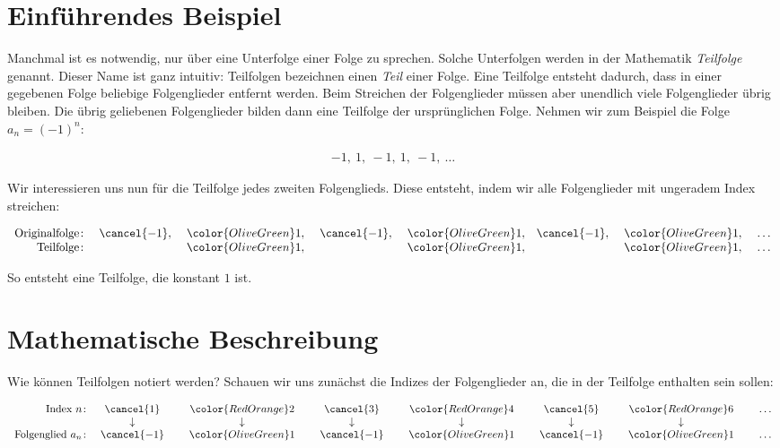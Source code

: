 \documentclass[fontsize=9pt,
               parskip=half-,
               DIV=14,
               listof=chapterentry,
               tocflat]{scrbook}
\begin{document}
\section{Einführendes Beispiel}

Manchmal ist es notwendig, nur über eine Unterfolge einer Folge zu sprechen. Solche Unterfolgen werden in der Mathematik \emph{Teilfolge} genannt. Dieser Name ist ganz intuitiv: Teilfolgen bezeichnen einen \emph{Teil} einer Folge. Eine Teilfolge entsteht dadurch, dass in einer gegebenen Folge beliebige Folgenglieder entfernt werden. Beim Streichen der Folgenglieder müssen aber unendlich viele Folgenglieder übrig bleiben. Die übrig geliebenen Folgenglieder bilden dann eine Teilfolge der ursprünglichen Folge. Nehmen wir zum Beispiel die Folge $a_{n}=(-1)^{n}$:

\begin{align*}
-1,\ 1,\ -1,\ 1,\ -1,\ \ldots 
\end{align*}

Wir interessieren uns nun für die Teilfolge jedes zweiten Folgenglieds. Diese entsteht, indem wir alle Folgenglieder mit ungeradem Index streichen:

\begin{align*}
{\begin{array}{rccccccc}{\text{Originalfolge}}\colon &{\cancel {-1}},\ &{\color {OliveGreen}1},\ &{\cancel {-1}},\ &{\color {OliveGreen}1},&{\cancel {-1}},\ &{\color {OliveGreen}1},\ &\ldots \\{\text{Teilfolge}}\colon &&{\color {OliveGreen}1},\ &&{\color {OliveGreen}1},&&{\color {OliveGreen}1},\ &\ldots \end{array}}
\end{align*}

So entsteht eine Teilfolge, die konstant $1$ ist.

\section{Mathematische Beschreibung}

Wie können Teilfolgen notiert werden? Schauen wir uns zunächst die Indizes der Folgenglieder an, die in der Teilfolge enthalten sein sollen:

\begin{align*}
{\begin{array}{rccccccccccccc}{\text{Index }}n\colon &{\cancel {1}}&\ &{\color {RedOrange}2}&\ &{\cancel {3}}&\ &{\color {RedOrange}4}&\ &{\cancel {5}}&\ &{\color {RedOrange}6}&\ &\ldots \\&\downarrow &&\downarrow &&\downarrow &&\downarrow &&\downarrow &&\downarrow &&\\{\text{Folgenglied }}a_{n}\colon &{\cancel {-1}}&\ &{\color {OliveGreen}1}&\ &{\cancel {-1}}&\ &{\color {OliveGreen}1}&\ &{\cancel {-1}}&\ &{\color {OliveGreen}1}&\ &\ldots \end{array}}
\end{align*}
\end{document}
